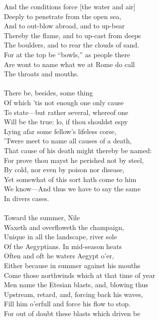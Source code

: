 And the conditions force [the water and air]\\
Deeply to penetrate from the open sea,\\
And to out-blow abroad, and to up-bear\\
Thereby the flame, and to up-cast from deeps\\
The boulders, and to rear the clouds of sand.\\
For at the top be ``bowls,'' as people there\\
Are wont to name what we at Rome do call\\
The throats and mouths.\\
\\
There be, besides, some thing\\
Of which 'tis not enough one only cause\\
To state—but rather several, whereof one\\
Will be the true: lo, if thou shouldst espy\\
Lying afar some fellow's lifeless corse,\\
'Twere meet to name all causes of a death,\\
That cause of his death might thereby be named:\\
For prove thou mayst he perished not by steel,\\
By cold, nor even by poison nor disease,\\
Yet somewhat of this sort hath come to him\\
We know—And thus we have to say the same\\
In divers cases.\\
\\
Toward the summer, Nile\\
Waxeth and overfloweth the champaign,\\
Unique in all the landscape, river sole\\
Of the Aegyptians. In mid-season heats\\
Often and oft he waters Aegypt o'er,\\
Either because in summer against his mouths\\
Come those northwinds which at that time of year\\
Men name the Etesian blasts, and, blowing thus\\
Upstream, retard, and, forcing back his waves,\\
Fill him o'erfull and force his flow to stop.\\
For out of doubt these blasts which driven be\\
